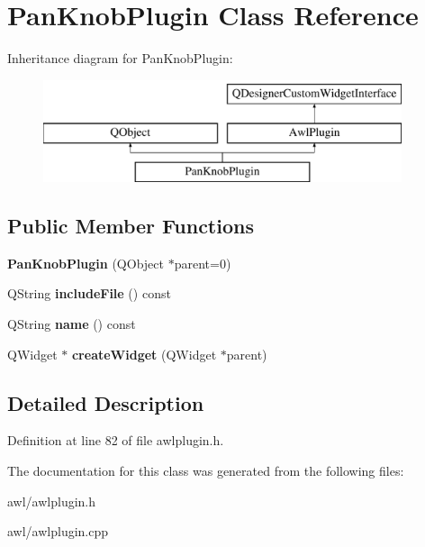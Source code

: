\hypertarget{class_pan_knob_plugin}{}\section{Pan\+Knob\+Plugin Class Reference}
\label{class_pan_knob_plugin}
Inheritance diagram for Pan\+Knob\+Plugin\+:\begin{figure}[H]
\begin{center}
\leavevmode
\includegraphics[height=3.000000cm]{class_pan_knob_plugin}
\end{center}
\end{figure}
\subsection*{Public Member Functions}
\begin{DoxyCompactItemize}
\item 
\mbox{\label{class_pan_knob_plugin_af2d85309d6af939e9be44d6035a989d6}} 
{\bfseries Pan\+Knob\+Plugin} (Q\+Object $\ast$parent=0)
\item 
\mbox{\label{class_pan_knob_plugin_a11a1b9fb4a882d6a47b7699cd48ca921}} 
Q\+String {\bfseries include\+File} () const
\item 
\mbox{\label{class_pan_knob_plugin_afd082a5e8adeeb275f78bbe4034a04e2}} 
Q\+String {\bfseries name} () const
\item 
\mbox{\label{class_pan_knob_plugin_ae0c9707ab14477b44d85410a6c3f07bf}} 
Q\+Widget $\ast$ {\bfseries create\+Widget} (Q\+Widget $\ast$parent)
\end{DoxyCompactItemize}


\subsection{Detailed Description}


Definition at line 82 of file awlplugin.\+h.



The documentation for this class was generated from the following files\+:\begin{DoxyCompactItemize}
\item 
awl/awlplugin.\+h\item 
awl/awlplugin.\+cpp\end{DoxyCompactItemize}
